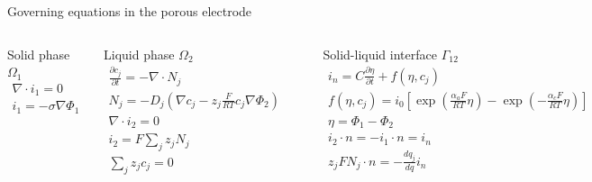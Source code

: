 \begin{frame}{Governing equations in the porous electrode}

\begin{columns}
\begin{block}{Solid phase $\Omega_1$}
\tiny
\begin{align*}
\nabla \cdot i_1 = 0 \\
i_1 = -\sigma \nabla \Phi_1
\end{align*}
\end{block}

\begin{block}{Liquid phase $\Omega_2$}
\tiny
\begin{align*}
\frac{\partial c_j}{\partial t} = - \nabla \cdot N_j \\
N_j = -D_j \left( \nabla c_j - z_j \frac{F}{RT} c_j \nabla \Phi_2 \right) \\
\nabla \cdot i_2 = 0 \\
i_2 = F \sum_j z_j N_j \\
\sum_j z_j c_j = 0
\end{align*}
\end{block}

\begin{center}
\end{center}

\begin{block}{Solid-liquid interface $\Gamma_{12}$}
\tiny
\begin{align*}
i_n = C \frac{\partial \eta}{\partial t} + f(\eta, c_j) \\
f(\eta, c_j) = i_0 \left[ \exp\left( \frac{\alpha_a F}{RT} \eta \right) - \exp\left( -\frac{\alpha_c F}{RT} \eta \right) \right] \\
\eta = \Phi_1 - \Phi_2 \\
i_2 \cdot n = -i_1 \cdot n = i_n \\
z_j F N_j \cdot n = -\frac{d q_j}{d q} i_n
\end{align*}
\end{block}
\end{columns}
\end{frame}

